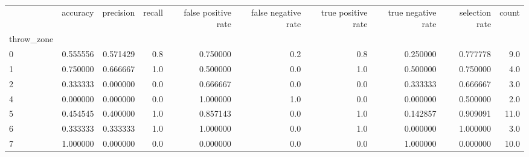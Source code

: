 \begin{tabular}{lrrrrrrrrr}
\toprule
{} &  accuracy &  precision &  recall &  false positive rate &  false negative rate &  true positive rate &  true negative rate &  selection rate &  count \\
throw\_zone &           &            &         &                      &                      &                     &                     &                 &        \\
\midrule
0          &  0.555556 &   0.571429 &     0.8 &             0.750000 &                  0.2 &                 0.8 &            0.250000 &        0.777778 &    9.0 \\
1          &  0.750000 &   0.666667 &     1.0 &             0.500000 &                  0.0 &                 1.0 &            0.500000 &        0.750000 &    4.0 \\
2          &  0.333333 &   0.000000 &     0.0 &             0.666667 &                  0.0 &                 0.0 &            0.333333 &        0.666667 &    3.0 \\
4          &  0.000000 &   0.000000 &     0.0 &             1.000000 &                  1.0 &                 0.0 &            0.000000 &        0.500000 &    2.0 \\
5          &  0.454545 &   0.400000 &     1.0 &             0.857143 &                  0.0 &                 1.0 &            0.142857 &        0.909091 &   11.0 \\
6          &  0.333333 &   0.333333 &     1.0 &             1.000000 &                  0.0 &                 1.0 &            0.000000 &        1.000000 &    3.0 \\
7          &  1.000000 &   0.000000 &     0.0 &             0.000000 &                  0.0 &                 0.0 &            1.000000 &        0.000000 &   10.0 \\
\bottomrule
\end{tabular}
